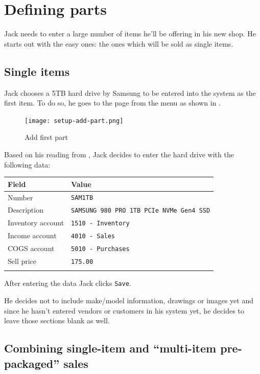 \section{Defining parts}
\label{sec-stock-parts}

Jack needs to enter a large number of items he'll be offering in his new shop. He starts out
with the easy ones: the ones which will be sold as single items.

\subsection{Single items}
\label{subsec-stock-parts-single-item}

Jack chooses a 5TB hard drive by Samsung to be entered into the system as the first item.
To do so, he goes to the  page from the menu
as shown in .

\begin{figure}[h]
\texttt{[image: setup-add-part.png]}
        \caption{Add first part}
        \label{fig:setup-add-part}
\end{figure}

Based on his reading from , Jack decides to enter the hard
drive with the following data:

\begin{tabular}{ll}
Field & Value\\ \hline
Number & \texttt{SAM1TB}\\
Description & \texttt{SAMSUNG 980 PRO 1TB PCIe NVMe Gen4 SSD} \\
Inventory account &  \texttt{1510 - Inventory}\\
Income account &  \texttt{4010 - Sales}\\
COGS account &  \texttt{5010 - Purchases}\\
Sell price &  \texttt{175.00}\\
\\
\end{tabular}

After entering the data Jack clicks \texttt{Save}.

He decides not to include make/model information, drawings or images yet and since
he hasn't entered vendors or customers in his system yet, he decides to leave
those sections blank as well.

\subsection{Combining single-item and ``multi-item pre-packaged'' sales}
\label{subsec-stock-parts-mulit-item}


